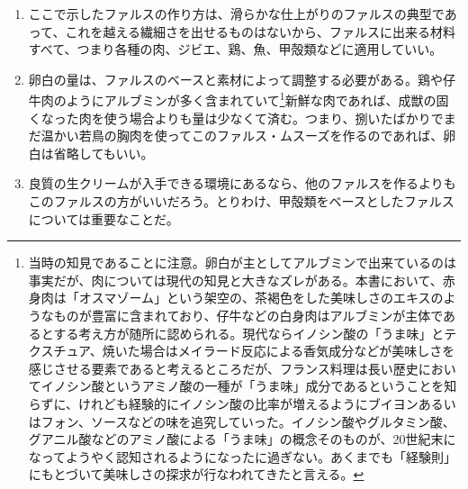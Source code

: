 \begin{recette}
\begin{enumerate}
\def\labelenumi{\arabic{enumi}.}
\setcounter{enumi}{1}
\item
  ここで示したファルスの作り方は、滑らかな仕上がりのファルスの典型であって、これを越える繊細さを出せるものはないから、ファルスに出来る材料すべて、つまり各種の肉、ジビエ、鶏、魚、甲殻類などに適用していい。
\item
  卵白の量は、ファルスのベースと素材によって調整する必要がある。鶏や仔牛肉のようにアルブミンが多く含まれていて\footnote{当時の知見であることに注意。卵白が主としてアルブミンで出来ているのは事実だが、肉については現代の知見と大きなズレがある。本書において、赤身肉は「オスマゾーム」という架空の、茶褐色をした美味しさのエキスのようなものが豊富に含まれており、仔牛などの白身肉はアルブミンが主体であるとする考え方が随所に認められる。現代ならイノシン酸の「うま味」とテクスチュア、焼いた場合はメイラード反応による香気成分などが美味しさを感じさせる要素であると考えるところだが、フランス料理は長い歴史においてイノシン酸というアミノ酸の一種が「うま味」成分であるということを知らずに、けれども経験的にイノシン酸の比率が増えるようにブイヨンあるいはフォン、ソースなどの味を追究していった。イノシン酸やグルタミン酸、グアニル酸などのアミノ酸による「うま味」の概念そのものが、20世紀末になってようやく認知されるようになったに過ぎない。あくまでも「経験則」にもとづいて美味しさの探求が行なわれてきたと言える。}新鮮な肉であれば、成獣の固くなった肉を使う場合よりも量は少なくて済む。つまり、捌いたばかりでまだ温かい若鳥の胸肉を使ってこのファルス・ムスーズを作るのであれば、卵白は省略してもいい。
\item
  良質の生クリームが入手できる環境にあるなら、他のファルスを作るよりもこのファルスの方がいいだろう。とりわけ、甲殻類をベースとしたファルスについては重要なことだ。
\end{enumerate}
\end{recette}
